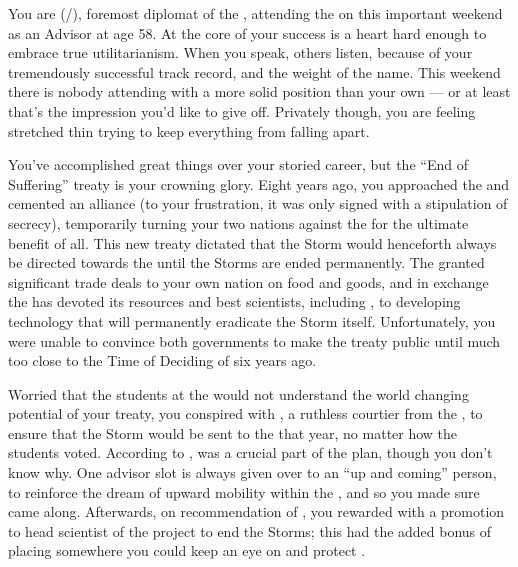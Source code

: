 \documentclass[char]{GL2020}
\begin{document}
\name{\cDiplomat{}}

You are \cDiplomat{\full} (\cDiplomat{\they}/\cDiplomat{\them}), foremost diplomat of the \pTech{}, attending the \pSchool{} on this important weekend as an Advisor at age 58. At the core of your success is a heart hard enough to embrace true utilitarianism. When you speak, others listen, because of your tremendously successful track record, and the weight of the \cDiplomat{\formal} name. This weekend there is nobody attending with a more solid position than your own — or at least that's the impression you'd like to give off. Privately though, you are feeling stretched thin trying to keep everything from falling apart. 

You've accomplished great things over your storied career, but the “End of Suffering” treaty is your crowning glory. Eight years ago, you approached the \pFarm{} and cemented an alliance (to your frustration, it was only signed with a stipulation of secrecy), temporarily turning your two nations against the \pShip{} for the ultimate benefit of all. This new treaty dictated that the Storm would henceforth always be directed towards the \pShip{} until the Storms are ended permanently. The \pFarm{} granted significant trade deals to your own nation on food and goods, and in exchange the \pTech{} has devoted its resources and best scientists, including \cHeadScientist{\full}, to developing technology that will permanently eradicate the Storm itself. Unfortunately, you were unable to convince both governments to make the treaty public until much too close to the Time of Deciding of six years ago.

Worried that the students at the \pSchool{} would not understand the world changing potential of your treaty, you conspired with \cEvil{\full}, a ruthless courtier from the \pFarm{}, to ensure that the Storm would be sent to the \pShip{} that year, no matter how the students voted. According to \cEvil{}, \cHeadScientist{\full} was a crucial part of the plan, though you don’t know why. One advisor slot is always given over to an ``up and coming'' person, to reinforce the dream of upward mobility within the \pTech{}, and so you made sure \cHeadScientist{} came along. Afterwards, on recommendation of \cEvil{}, you rewarded \cHeadScientist{} with a promotion to head scientist of the project to end the Storms; this had the added bonus of placing \cHeadScientist{\them} somewhere you could keep an eye on and protect \cHeadScientist{\them}.
\end{document}
